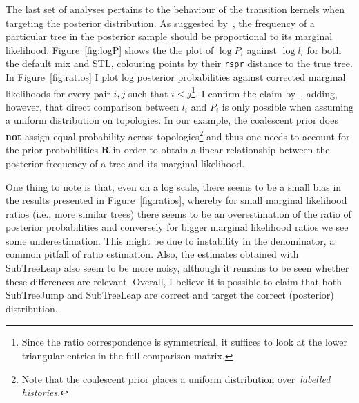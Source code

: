 The last set of analyses pertains to the behaviour of the transition kernels when targeting the \underline{posterior} distribution.
As suggested by~\cite{Hoehna2008}, the frequency of a particular tree in the posterior sample should be proportional to its marginal likelihood.
Figure~\ref{fig:logP} shows the the plot of $\log P_i$ against $\log l_i$ for both the default mix and STL, colouring points by their \verb|rspr| distance to the true tree.
In Figure~\ref{fig:ratios} I plot log posterior probabilities against corrected marginal likelihoods for every pair $i, j$ such that $i < j$\footnote{Since the ratio correspondence is symmetrical, it suffices to look at the lower triangular entries in the full comparison matrix.}.
I confirm the claim by~\cite{Hoehna2008}, adding, however, that direct comparison between $l_i$ and $P_i$ is only possible when assuming a uniform distribution on topologies.
In our example, the coalescent prior does \textbf{not} assign equal probability across topologies\footnote{Note that the coalescent prior places a uniform distribution over~\textit{labelled histories}.} and thus one needs to account for the prior probabilities $\boldsymbol R$ in order to obtain a linear relationship between the posterior frequency of a tree and its marginal likelihood.

One thing to note is that, even on  a log scale, there seems to be a small bias in the results presented in Figure~\ref{fig:ratios}, whereby for small marginal likelihood ratios (i.e., more similar trees) there seems to be an overestimation of the ratio of posterior probabilities and conversely for bigger marginal likelihood ratios we see some underestimation.
This might be due to instability in the denominator, a common pitfall of ratio estimation.
Also, the estimates obtained with SubTreeLeap also seem to be more noisy, although it remains to be seen whether these differences are relevant.
Overall, I believe it is possible to claim that both SubTreeJump and SubTreeLeap are correct and target the correct (posterior) distribution.

% 
% 

